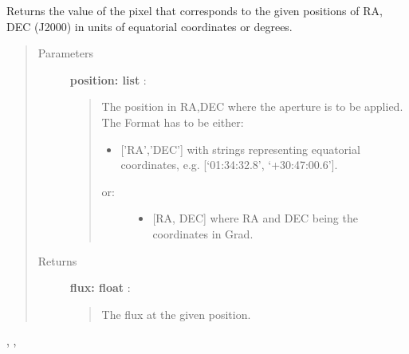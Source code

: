 \documentclass[a4paper,10pt,english]{sphinxmanual}
\begin{document}
\begin{fulllineitems}
\begin{fulllineitems}
\end{fulllineitems}


\begin{fulllineitems}
\label{maps:astrolyze.maps.fits.FitsMap.read_flux}
Returns the value of the pixel that corresponds to the
given positions of RA, DEC (J2000) in units of equatorial
coordinates or degrees.
\begin{quote}\begin{description}
\item[{Parameters }] \leavevmode
\textbf{position: list} :
\begin{quote}

The position in RA,DEC where the aperture is to be applied.
The Format has to be either:
\begin{itemize}
\item {} 
{[}'RA','DEC'{]} with strings representing equatorial
coordinates, e.g. {[}`01:34:32.8', `+30:47:00.6'{]}.

\end{itemize}
\begin{description}
\item[{or:}] \leavevmode\begin{itemize}
\item {} 
{[}RA, DEC{]} where RA and DEC being the coordinates in Grad.

\end{itemize}

\end{description}
\end{quote}

\item[{Returns }] \leavevmode
\textbf{flux: float} :
\begin{quote}

The flux at the given position.
\end{quote}

\end{description}\end{quote}




, , 



\end{fulllineitems}



\end{fulllineitems}
\end{document}
